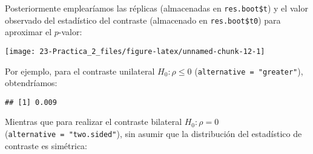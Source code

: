 \documentclass[
]{book}
\newenvironment{Shaded}{\begin{snugshade}}{\end{snugshade}}
\newcommand{\DataTypeTok}[1]{\textcolor[rgb]{0.13,0.29,0.53}{#1}}
\newcommand{\DecValTok}[1]{\textcolor[rgb]{0.00,0.00,0.81}{#1}}
\newcommand{\KeywordTok}[1]{\textcolor[rgb]{0.13,0.29,0.53}{\textbf{#1}}}
\newcommand{\NormalTok}[1]{#1}
\newcommand{\OperatorTok}[1]{\textcolor[rgb]{0.81,0.36,0.00}{\textbf{#1}}}
\newcommand{\OtherTok}[1]{\textcolor[rgb]{0.56,0.35,0.01}{#1}}
\newcommand{\StringTok}[1]{\textcolor[rgb]{0.31,0.60,0.02}{#1}}
\theoremstyle{definition}
\theoremstyle{definition}
\theoremstyle{definition}
\theoremstyle{remark}
\begin{document}
Posteriormente emplearíamos las réplicas (almacenadas en \texttt{res.boot\$t}) y el valor
observado del estadístico del contraste (almacenado en \texttt{res.boot\$t0})
para aproximar el \(p\)-valor:

\begin{Shaded}
\end{Shaded}

\begin{center}\texttt{[image: 23-Practica\_2\_files/figure-latex/unnamed-chunk-12-1]} \end{center}

Por ejemplo, para el contraste unilateral \(H_0: \rho \leq 0\)
(\texttt{alternative\ =\ "greater"}), obtendríamos:

\begin{Shaded}
\end{Shaded}

\begin{verbatim}
## [1] 0.009
\end{verbatim}

Mientras que para realizar el contraste bilateral \(H_0: \rho = 0\)
(\texttt{alternative\ =\ "two.sided"}), sin asumir que
la distribución del estadístico de contraste es simétrica:

\begin{Shaded}
\end{Shaded}
\end{document}
